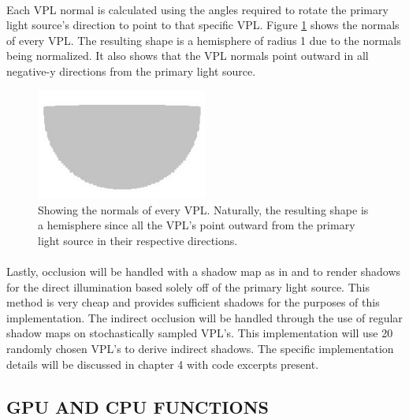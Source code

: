 \paragraph{}
Each VPL normal is calculated using the angles required to rotate the primary light source's direction to point to that specific VPL.  Figure \ref{fig:vplNormals} shows the normals of every VPL.  The resulting shape is a hemisphere of radius 1 due to the normals being normalized.  It also shows that the VPL normals point outward in all negative-y directions from the primary light source.

\begin{figure}[h!]
  \centering
    \includegraphics[width=0.5\textwidth]{vplNormals.jpg}
  	\caption{Showing the normals of every VPL. Naturally, the resulting shape is a hemisphere since all the VPL's point outward from the primary light source in their respective directions.}
	\label{fig:vplNormals}
\end{figure}

\paragraph{}
Lastly, occlusion will be handled with a shadow map as in \cite{Williams1978} and \cite{Reeves1987} to render shadows for the direct illumination based solely off of the primary light source.  This method is very cheap and provides sufficient shadows for the purposes of this implementation.  The indirect occlusion will be handled through the use of regular shadow maps on stochastically sampled VPL's.  This implementation will use 20 randomly chosen VPL's to derive indirect shadows.  The specific implementation details will be discussed in chapter 4 with code excerpts present.

\subsection{GPU AND CPU FUNCTIONS}

